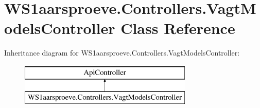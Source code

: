 \hypertarget{class_w_s1aarsproeve_1_1_controllers_1_1_vagt_models_controller}{}\section{W\+S1aarsproeve.\+Controllers.\+Vagt\+Models\+Controller Class Reference}
\label{class_w_s1aarsproeve_1_1_controllers_1_1_vagt_models_controller}
Inheritance diagram for W\+S1aarsproeve.\+Controllers.\+Vagt\+Models\+Controller\+:\begin{figure}[H]
\begin{center}
\leavevmode
\includegraphics[height=2.000000cm]{class_w_s1aarsproeve_1_1_controllers_1_1_vagt_models_controller}
\end{center}
\end{figure}
